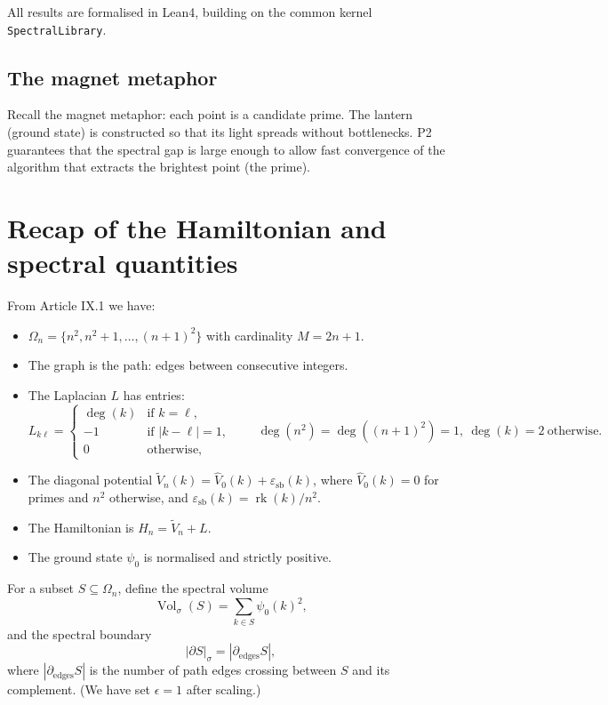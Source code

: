 \documentclass[11pt,a4paper]{article}
\begin{document}
All results are formalised in Lean4, building on the common kernel \texttt{SpectralLibrary}.

\subsection{The magnet metaphor}

Recall the magnet metaphor: each point is a candidate prime. The lantern (ground state) is constructed so that its light spreads without bottlenecks. P2 guarantees that the spectral gap is large enough to allow fast convergence of the algorithm that extracts the brightest point (the prime).

\section{Recap of the Hamiltonian and spectral quantities}

From Article IX.1 we have:
\begin{itemize}
\item $\Omega_n = \{n^2, n^2+1, \dots, (n+1)^2\}$ with cardinality $M = 2n+1$.
\item The graph is the path: edges between consecutive integers.
\item The Laplacian $L$ has entries:
  \[
  L_{k\ell} = \begin{cases}
  \deg(k) & \text{if } k=\ell,\\
  -1 & \text{if } |k-\ell|=1,\\
  0 & \text{otherwise},
  \end{cases}
  \qquad
  \deg(n^2)=\deg((n+1)^2)=1,\ \deg(k)=2\ \text{otherwise}.
  \]
\item The diagonal potential $\tilde{V}_n(k) = \hat{V}_0(k) + \varepsilon_{\text{sb}}(k)$, where $\hat{V}_0(k)=0$ for primes and $n^2$ otherwise, and $\varepsilon_{\text{sb}}(k)=\operatorname{rk}(k)/n^2$.
\item The Hamiltonian is $H_n = \tilde{V}_n + L$.
\item The ground state $\psi_0$ is normalised and strictly positive.
\end{itemize}

For a subset $S\subseteq\Omega_n$, define the spectral volume
\[
\operatorname{Vol}_\sigma(S) = \sum_{k\in S} \psi_0(k)^2,
\]
and the spectral boundary
\[
|\partial S|_\sigma = |\partial_{\mathrm{edges}} S|,
\]
where $|\partial_{\mathrm{edges}} S|$ is the number of path edges crossing between $S$ and its complement. (We have set $\epsilon=1$ after scaling.)
\end{document}
